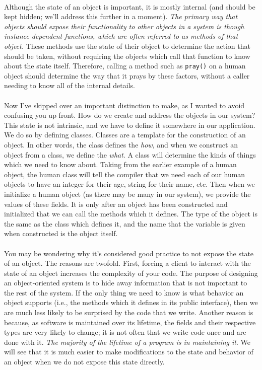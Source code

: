 \documentclass{article}
\begin{document}
\paragraph{}
Although the state of an object is important, it is mostly internal (and should
be kept hidden; we'll address this further in a moment). \textit{The primary way that
objects should expose their functionality to other objects in a system is though
instance-dependent functions, which are often referred to as methods of that
object.} These methods use the state of their object to determine the action
that
should be taken, without requiring the objects which call that function to know
about the state itself. Therefore, calling a method such as \texttt{pray()} on a human
object should determine the way that it prays by these factors, without a caller needing to know all of the internal details.
\paragraph{}
Now I've skipped over an important distinction to make, as I wanted to avoid
confusing you up front. How do we create and address the objects in our system?
This state is not intrinsic, and we have to define it somewhere in our
application. We do so by defining classes. Classes are a template for the
construction of an object. In other words, the class defines the \textit{how},
and when
we construct an object from a class, we define the \textit{what}. A class will
determine
the kinds of things which we need to know about. Taking from the earlier example
of a human object, the human class will tell the compiler that we need each of
our human objects to have an integer for their age, string for their name, etc.
Then when we initialize a human object (as there may be many in our system), we
provide the values of these fields. It is only after an object has been
constructed and initialized that we can call the methods which it defines. The
type of the object is the same as the class which defines it, and the name that
the variable is given when constructed is the object itself.
\paragraph{}
You may be wondering why it’s considered good practice to not expose the state
of an object. The reasons are twofold. First, forcing a client to interact with
the state of an object increases the complexity of your code. The purpose of
designing an object-oriented system is to hide away information that is not
important to the rest of the system. If the only thing we need to know is what
behavior an object supports (i.e., the methods which it defines in its public
interface), then we are much less likely to be surprised by the code that we
write. Another reason is because, as software is maintained over its lifetime,
the fields and their respective types are very likely to change; it is not often
that we write code once and are done with it. \textit{The majority of the
lifetime of a
program is in maintaining it}. We will see that it is much easier to make
modifications to the state and behavior of an object when we do not expose this
state directly.
\end{document}
